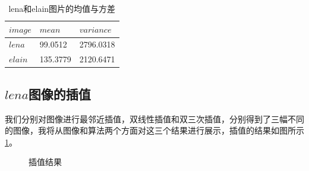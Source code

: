 \documentclass[UTF8]{ctexart}
\begin{document}
\begin{table}[h!]
	\centering
	\begin{tabular}{|m{2cm}<{\centering}|m{3cm}<{\centering}|m{3cm}<{\centering}|}
		\hline
		$image$ & $mean$ & $variance$ \\
		\hline
		$lena$ & 99.0512 & 2796.0318 \\
		\hline
		$elain$ & 135.3779 & 2120.6471\\
		\hline
	\end{tabular}
	\caption{lena和elain图片的均值与方差}
	\label{mean_var}
\end{table}

\subsection{$lena$图像的插值}

我们分别对图像进行最邻近插值，双线性插值和双三次插值，分别得到了三幅不同的图像，我将从图像和算法两个方面对这三个结果进行展示，插值的结果如图所示\ref{interpolation_result}。

\begin{figure}[h!]
	\centering
	\hspace{0.1in} 
	\hspace{0.1in} 
	\caption{插值结果} 
	\label{interpolation_result} %
\end{figure}
\end{document}

